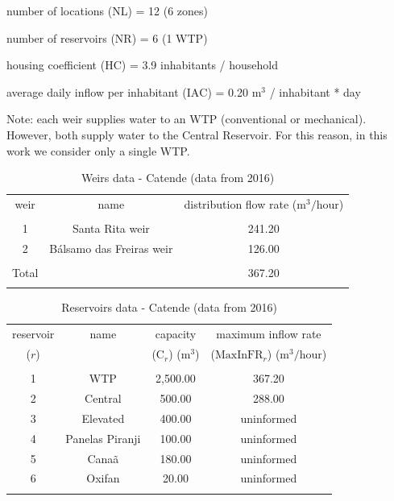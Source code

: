 \documentclass{singlecol}
\theoremstyle{TH}{
\newtheorem{lemma}{Lemma}
\newtheorem{theorem}[lemma]{Theorem}
\newtheorem{corrolary}[lemma]{Corrolary}
\newtheorem{conjecture}[lemma]{Conjecture}
\newtheorem{proposition}[lemma]{Proposition}
\newtheorem{claim}[lemma]{Claim}
\newtheorem{stheorem}[lemma]{Wrong Theorem}
\newtheorem{algorithm}{Algorithm}
}
\theoremstyle{THrm}{
\newtheorem{definition}{Definition}[section]
\newtheorem{question}{Question}[section]
\newtheorem{remark}{Remark}
\newtheorem{scheme}{Scheme}
}
\theoremstyle{THhit}{
\newtheorem{case}{Case}[section]
}
\begin{document}
\noindent number of locations (NL) = 12 (6 zones) 

\noindent number of reservoirs (NR) = 6 (1 WTP) 

\noindent housing coefficient ($\mathrm{HC}$) = 3.9 inhabitants / household 

\noindent average daily inflow per inhabitant ($\mathrm{IAC}$) = 0.20 $\mathrm{m^3}$ / inhabitant * day 

\noindent Note: each weir supplies water to an WTP (conventional or mechanical). However, both supply water to the Central Reservoir. For this reason, in this work we consider only a single WTP. 

\begin{table}[H]
\begin{center}
	\begin{tabular}{ c  c  c } 
		weir      & name        & distribution flow rate  ($\mathrm{m^3/hour}$)     \\
		                                                                    \\
		1              & Santa Rita weir            & 241.20         \\
		2              & Bálsamo das Freiras  weir  & 126.00         \\
							                                                \\
		\hline
		Total          &                               & 367.20       \\
		\\
	\end{tabular}
\caption{Weirs data - Catende (data from 2016)}
\label{tab:weirsCatende}
\end{center}
\end{table}

\begin{table}[H]
\begin{center}
	\begin{tabular}{ c  c  c  c } 
		reservoir      & name              & capacity                       & maximum inflow rate    \\
		($r$)          &             	   &  ($\mathrm{C}_{r}$) ($\mathrm{m^3}$)    &  ($\mathrm{MaxInFR}_{r}$) ($\mathrm{m^3/hour}$) \\
		\\
		1              & WTP                &   2,500.00           &  367.20  \\
		2              & Central             &   500.00		&  288.00  \\
		3              & Elevated           &   400.00          & uninformed \\
		4              & Panelas Piranji  &   100.00            & uninformed  \\
		5              & Canaã              &   180.00          & uninformed  \\
		6              & Oxifan              &   20.00          & uninformed  \\
		\\
	\end{tabular}
\caption{Reservoirs data - Catende (data from 2016)}
\label{tab:reservoirsCatende}
\end{center}
\end{table}
\end{document}
